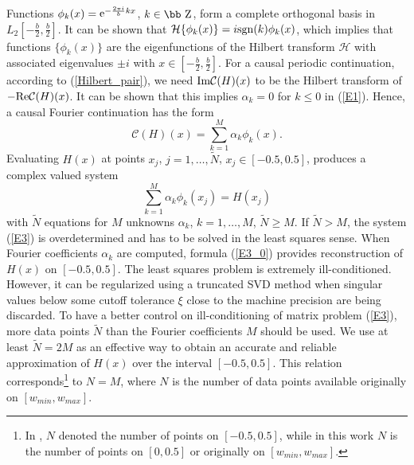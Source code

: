 \documentclass[journal,twoside]{IEEEtran}
\begin{document}
Functions $\phi_{k}(x)={\mathop{\rm e}\nolimits}^{-\frac{2\pi i }{b}k x}$, $k\in{\hbox{\bb Z}}$, form a complete orthogonal basis in $L_2[-\frac b2, \frac b2]$. It can be shown that  ${\mathcal H}\{\phi_k(x)\}= i{\mathop{\rm sgn}\nolimits}(k)  \phi_k(x)$, which implies that functions $\{\phi_k(x)\}$ are the eigenfunctions of the Hilbert transform ${\mathcal H}$ with associated eigenvalues $\pm i$ with $x\in[-\frac b2,\frac b2]$. For a causal periodic continuation, according to (\ref{Hilbert_pair}), we need ${\mathop{\rm Im}\nolimits}{\mathcal C}(H)(x)$ to be the  Hilbert transform of $-{\mathop{\rm Re}\nolimits}{\mathcal C}(H)(x)$. It can be shown \cite{Barannyk_Aboutaleb_Elshabini_Barlow_IEEE} that this implies  $\alpha_{k}=0$ for $k\leq 0$ in  (\ref{E1}). Hence, a causal Fourier continuation has the form
\begin{equation} \label{E3_0}
{\mathcal C}(H)(x)=\sum_{k=1}^{M}  \alpha_k \phi_k(x). 
\end{equation}
Evaluating $H(x)$ at points $x_j$, $j=1,\ldots,\tilde N$, $x_j\in[-0.5, 0.5]$, produces a complex valued system
\begin{equation} \label{E3}
\sum_{k=1}^{M}  \alpha_k \phi_k(x_j)= H(x_j)
\end{equation}
with $\tilde N$ equations for $M$ unknowns $\alpha_{k}$, $k=1,\ldots,M$, $\tilde N\geq M$. If $\tilde N>M$,  the system (\ref{E3})  is overdetermined and has to be solved in the least squares sense. When Fourier coefficients $\alpha_k$ are computed, formula (\ref{E3_0}) provides reconstruction of $H(x)$ on $[-0.5, 0.5]$. The least squares problem is extremely ill-conditioned. However, it can be regularized using a truncated SVD method when singular values below some cutoff tolerance $\xi$  close to the machine precision are being discarded. 
To have a better control on ill-conditioning of matrix problem (\ref{E3}),   more data points $\tilde N$ than the Fourier coefficients $M$ should be used.
We use at least $\tilde N=2M$ as an effective way to obtain an 
accurate and reliable approximation of $H(x)$ over the  interval $[-0.5, 0.5]$. This relation corresponds\footnote{In \cite{Barannyk_Aboutaleb_Elshabini_Barlow_IEEE}, $N$ denoted the number of points on $[-0.5, 0.5]$, while in this work $N$ is the number of points on $[0, 0.5]$ or originally on $[w_{min},w_{max}]$.} to $N=M$, where $N$ is the number of data points available originally on $[w_{min},w_{max}]$.
\end{document}
